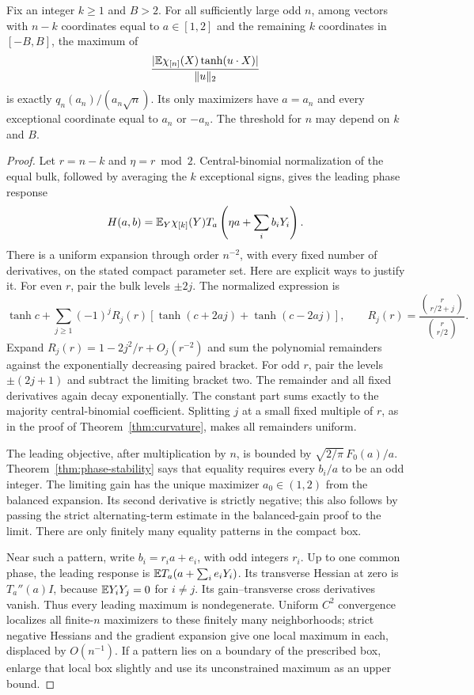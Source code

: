 \begin{theorem}
\label{thm:fixed-real-defects}
Fix an integer $k\ge1$ and $B>2$. For all sufficiently large odd $n$,
among vectors with $n-k$ coordinates equal to $a\in[1,2]$ and the
remaining $k$ coordinates in $[-B,B]$, the maximum of
\[
 \frac{|\mathbb E\chi_{[n]}(X)\tanh(u\cdot X)|}{\|u\|_2}
\]
is exactly $q_n(a_n)/(a_n\sqrt n)$. Its only maximizers have
$a=a_n$ and every exceptional coordinate equal to $a_n$ or $-a_n$.
The threshold for $n$ may depend on $k$ and $B$.
\end{theorem}
\begin{proof}
Let $r=n-k$ and $\eta=r\bmod2$. Central-binomial normalization of the
equal bulk, followed by averaging the $k$ exceptional signs, gives the
leading phase response
\[
 H(a,b)=\mathbb E_Y\chi_{[k]}(Y)
       T_a\left(\eta a+\sum_i b_iY_i\right).
\]
There is a uniform expansion through order $n^{-2}$, with every fixed
number of derivatives, on the stated compact parameter set. Here are
explicit ways to justify it. For even $r$, pair the bulk levels $\pm2j$.
The normalized expression is
\[
 \tanh c+\sum_{j\ge1}(-1)^j R_j(r)
 [\tanh(c+2aj)+\tanh(c-2aj)],\qquad
 R_j(r)=\frac{\binom r{r/2+j}}{\binom r{r/2}}.
\]
Expand $R_j(r)=1-2j^2/r+O_j(r^{-2})$ and sum the polynomial
remainders against the exponentially decreasing paired bracket.
For odd $r$, pair the levels $\pm(2j+1)$ and subtract the limiting
bracket two. The remainder and all fixed derivatives again decay
exponentially. The constant part sums exactly to the majority
central-binomial coefficient. Splitting $j$ at a small fixed multiple
of $r$, as in the proof of Theorem~\ref{thm:curvature}, makes all
remainders uniform.

The leading objective, after multiplication by $n$, is bounded by
$\sqrt{2/\pi}\,F_0(a)/a$. Theorem~\ref{thm:phase-stability} says that
equality requires every $b_i/a$ to be an odd integer. The limiting gain
has the unique maximizer $a_0\in(1,2)$ from the balanced expansion.
Its second derivative is strictly negative; this also follows by
passing the strict alternating-term estimate in the balanced-gain
proof to the limit. There are only finitely many equality patterns
in the compact box.

Near such a pattern, write $b_i=r_i a+e_i$, with odd integers $r_i$.
Up to one common phase, the leading response is
$\mathbb E T_a(a+\sum_i e_iY_i)$. Its transverse Hessian at zero is
$T_a''(a)I$, because $\mathbb E Y_iY_j=0$ for $i\ne j$.
Its gain--transverse cross derivatives vanish. Thus every leading
maximum is nondegenerate. Uniform $C^2$ convergence localizes all
finite-$n$ maximizers to these finitely many neighborhoods; strict
negative Hessians and the gradient expansion give one local maximum
in each, displaced by $O(n^{-1})$. If a pattern lies on a boundary
of the prescribed box, enlarge that local box slightly and use its
unconstrained maximum as an upper bound.


\end{proof}
